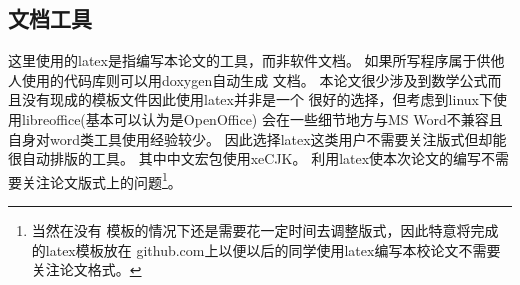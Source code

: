 \subsection{文档工具}
这里使用的latex是指编写本论文的工具，而非软件文档。
如果所写程序属于供他人使用的代码库则可以用doxygen自动生成
文档。
本论文很少涉及到数学公式而且没有现成的模板文件因此使用latex并非是一个
很好的选择，但考虑到linux下使用libreoffice(基本可以认为是OpenOffice)
会在一些细节地方与MS Word不兼容且自身对word类工具使用经验较少。
因此选择latex这类用户不需要关注版式但却能很自动排版的工具。
其中中文宏包使用xeCJK。
利用latex使本次论文的编写不需要关注论文版式上的问题\footnote{当然在没有
模板的情况下还是需要花一定时间去调整版式，因此特意将完成的latex模板放在
github.com上以便以后的同学使用latex编写本校论文不需要关注论文格式。}。
